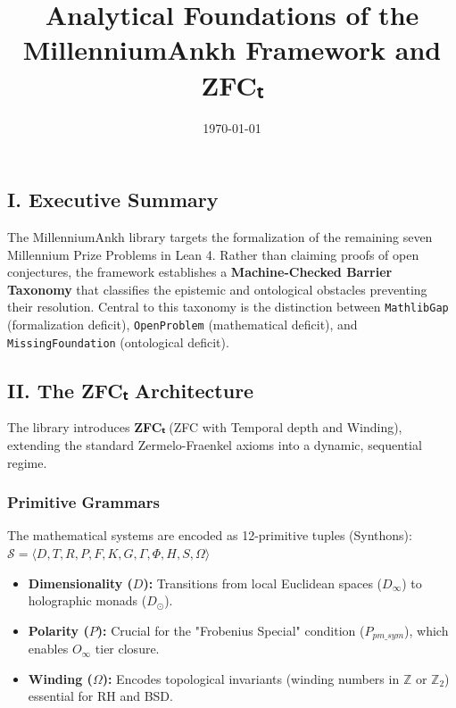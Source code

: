 \documentclass[12pt,a4paper]{article}
\begin{document}
\title{Analytical Foundations of the MillenniumAnkh Framework and ZFCₜ}
\date{\today}

\maketitle

\subsection{I. Executive Summary}

The MillenniumAnkh library targets the formalization of the remaining seven Millennium Prize Problems in Lean 4. Rather than claiming proofs of open conjectures, the framework establishes a \textbf{Machine-Checked Barrier Taxonomy} that classifies the epistemic and ontological obstacles preventing their resolution. Central to this taxonomy is the distinction between \texttt{MathlibGap} (formalization deficit), \texttt{OpenProblem} (mathematical deficit), and \texttt{MissingFoundation} (ontological deficit).

\subsection{II. The ZFCₜ Architecture}

The library introduces \textbf{ZFCₜ} (ZFC with Temporal depth and Winding), extending the standard Zermelo-Fraenkel axioms into a dynamic, sequential regime.

\subsubsection{Primitive Grammars}

The mathematical systems are encoded as 12-primitive tuples (Synthons):
$\mathcal{S} = \langle D, T, R, P, F, K, G, \Gamma, \Phi, H, S, \Omega \rangle$

\begin{itemize}
    \item \textbf{Dimensionality ($D$):} Transitions from local Euclidean spaces ($D_{\infty}$) to holographic monads ($D_{\odot}$).
    \item \textbf{Polarity ($P$):} Crucial for the "Frobenius Special" condition ($P_{pm\_sym}$), which enables $O_{\infty}$ tier closure.
    \item \textbf{Winding ($\Omega$):} Encodes topological invariants (winding numbers in $\mathbb{Z}$ or $\mathbb{Z}_2$) essential for RH and BSD.
\end{itemize}
\end{document}
